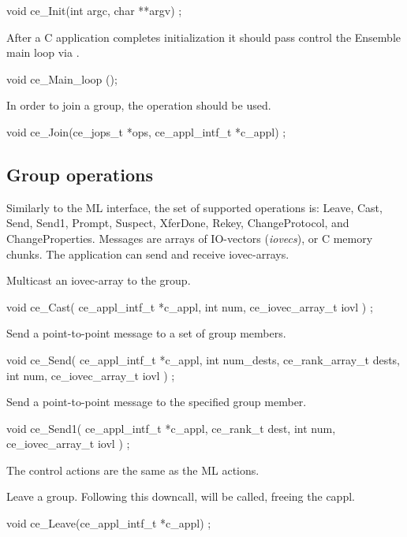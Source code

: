 \begin{codebox}
void ce_Init(int argc, char **argv) ;
\end{codebox}


After a C application completes initialization it should pass control 
the Ensemble main loop via .

\begin{codebox}
void ce_Main_loop ();
\end{codebox}
			 
In order to join a group, the  operation should be used.
\begin{codebox}
void ce_Join(ce_jops_t *ops, ce_appl_intf_t *c_appl) ;
\end{codebox}

\subsection{Group operations}
Similarly to the ML interface, the set of supported operations is:
Leave, Cast, Send, Send1, Prompt, Suspect, XferDone, Rekey,
ChangeProtocol, and ChangeProperties. Messages are arrays of
IO-vectors ({\it iovecs}), or C memory chunks.  The application can
send and receive iovec-arrays.

Multicast an iovec-array to the group. 
\begin{codebox}
void ce_Cast(
    ce_appl_intf_t *c_appl,
    int num,
    ce_iovec_array_t iovl
) ;
\end{codebox}

Send a point-to-point message to a set of group members.
\begin{codebox}
void ce_Send(
    ce_appl_intf_t *c_appl,
    int num_dests,
    ce_rank_array_t dests,
    int num,
    ce_iovec_array_t iovl
) ;
\end{codebox}

Send a point-to-point message to the specified group member.
\begin{codebox}
void ce_Send1(
    ce_appl_intf_t *c_appl,
    ce_rank_t dest,
    int num,
    ce_iovec_array_t iovl
) ;
\end{codebox}

The control actions are the same as the ML actions.

Leave a group. Following this downcall,  will be called, 
freeing the cappl. 
\begin{codebox}
void ce_Leave(ce_appl_intf_t *c_appl) ;
\end{codebox}

